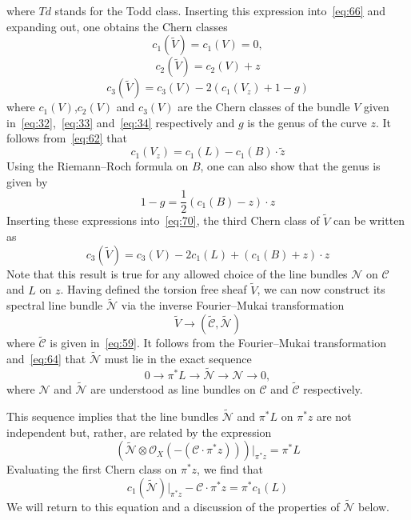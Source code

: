 \documentclass[a4paper,12pt]{article}
\numberwithin{equation}{section}
\def\cC{{\mathcal C}}
\def\cN{{\mathcal N}}
\def\cO{{\mathcal O}}
\theoremstyle{plain}
\begin{document}
where $Td$ stands for the Todd class. Inserting this expression
into~\eqref{eq:66} and expanding out, one obtains the Chern classes
\begin{equation}
c_{1}(\widetilde{V})=c_{1}(V)=0,
\label{eq:68}
\end{equation}
\begin{equation}
c_{2}(\tilde{V})=c_{2}(V) +z
\label{eq:69}
\end{equation}
\begin{equation}
c_{3}(\tilde{V})=c_{3}(V)-2(c_{1}(V_{z})+1-g)
\label{eq:70}
\end{equation}
where $c_{1}(V)$,$c_{2}(V)$ and $c_{3}(V)$ are the Chern classes of the bundle
$V$ given in~\eqref{eq:32},~\eqref{eq:33} and~\eqref{eq:34} respectively
and $g$ is the genus of the curve $z$.
It follows from~\eqref{eq:62} that
\begin{equation}
c_{1}(V_{z})=c_{1}(L) -c_{1}(B) \cdot \tilde{z}
\label{eq:71A}
\end{equation}
Using the Riemann--Roch formula on $B$, one can also show that the
genus is given by 
\begin{equation}
1-g=\frac{1}{2}(c_{1}(B)-z)\cdot z
\label{eq:71B}
\end{equation}
Inserting these expressions into~\eqref{eq:70}, the third Chern
class of $\widetilde{V}$ can be written as
\begin{equation}
c_{3}(\widetilde{V})=c_{3}(V)-2c_{1}(L) +(c_{1}(B)+z)\cdot z
\label{eq:71C}
\end{equation}
Note that this result is true for any allowed choice of the line bundles
$\cN$ on $\cC$ and $L$ on $z$. Having defined the torsion free sheaf 
$\widetilde{V}$, we can now construct its spectral line bundle 
$\widetilde{\cN}$ via the
inverse Fourier--Mukai transformation
\begin{equation}
\widetilde{V} \longrightarrow (\widetilde{\cC},\widetilde{\cN})
\label{eq:72}
\end{equation}
where $\widetilde{\cC}$ is given in~\eqref{eq:59}. It follows
from the Fourier--Mukai transformation and~\eqref{eq:64} 
that $\widetilde{\cN}$ must lie in the exact sequence
\begin{equation}
0 \rightarrow \pi^{*}L \rightarrow \widetilde{\cN} \rightarrow 
\cN \rightarrow 0,
\label{eq:73}
\end{equation}
where $\cN$ and $\widetilde{\cN}$ are understood as line bundles on
$\cC$ and $\widetilde{\cC}$ respectively.

This sequence implies that the line bundles $\widetilde{\cN}$ and
$\pi^{*}L$  on $\pi^{*}z$ are not 
independent but, rather, are related by the expression
\begin{equation}
\left(\widetilde{\cN} \otimes \cO_{X}(-(\cC \cdot \pi^{*}z))
\right)|_{\pi^{*}z}=\pi^{*}L
\label{eq:74}
\end{equation}
Evaluating the first Chern class on $\pi^{*}z$, we find that
\begin{equation}
c_{1}(\widetilde{\cN})|_{\pi^{*}z} -\cC \cdot \pi^{*}z= \pi^{*}c_{1}(L)
\label{eq:75}
\end{equation}
We will return to this equation and a
discussion of the properties of $\widetilde{\cN}$ below.
\end{document}

